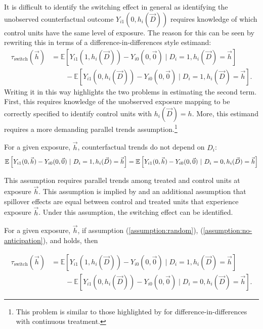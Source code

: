 \documentclass[11pt]{article}
\begin{document}
It is difficult to identify the switching effect in general as identifying the unobserved counterfactual outcome $Y_{i1}(0, h_i(\vec{D}))$ requires knowledge of which control units have the same level of exposure. The reason for this can be seen by rewriting this in terms of a difference-in-differences style estimand:
\begin{align*}
    \tau_{\text{switch}}(\vec{h}) &= \mathbb{E} \left[ Y_{i1}(1, h_i(\vec{D})) - Y_{i0}(0,\vec{0}) \mid D_i = 1, h_i(\vec{D}) = \vec{h} \right] \\ 
    &\quad\quad - \mathbb{E} \left[ Y_{i1}(0, h_i(\vec{D})) - Y_{i0}(0,\vec{0}) \mid D_i = 1, h_i(\vec{D}) = \vec{h} \right].
\end{align*}
Writing it in this way highlights the two problems in estimating the second term. First, this requires knowledge of the unobserved exposure mapping to be correctly specified to identify control units with $h_i(\vec{D}) = h$. More, this estimand requires a more demanding parallel trends assumption.\footnote{This problem is similar to those highlighted by \citet{Callaway_Goodman-Bacon_SantAnna_2021} for difference-in-differences with continuous treatment.}  

\begin{assumption}\label{assumption:parallel-switching}
    For a given exposure, $\vec{h}$, counterfactual trends do not depend on $D_i$:
    \[ 
        \mathbb{E}\left[Y_{i1}(0, \vec{h}) - Y_{i0}(0, \vec{0}) \ \vert \ D_i = 1, h_i(\vec{D}) = \vec{h} \right] = 
        \mathbb{E}\left[Y_{i1}(0, \vec{h}) - Y_{i0}(0, \vec{0}) \ \vert \ D_i = 0, h_i(\vec{D}) = \vec{h} \right]
    \]
\end{assumption}

This assumption requires parallel trends among treated and control units at exposure $\vec{h}$. This assumption is implied by  and an additional assumption that spillover effects are equal between control and treated units that experience exposure $\vec{h}$. Under this assumption, the switching effect can be identified.

\begin{proposition}
    For a given exposure, $\vec{h}$, if assumption (\ref{assumption:random}), (\ref{assumption:no-anticipation}), and  holds, then 

    \begin{align*}
        \tau_{\text{switch}}(\vec{h}) &= \mathbb{E} \left[ Y_{i1}(1, h_i(\vec{D})) - Y_{i0}(0,\vec{0}) \mid D_i = 1, h_i(\vec{D}) = \vec{h} \right] \\ 
        &\quad\quad - \mathbb{E} \left[ Y_{i1}(0, h_i(\vec{D})) - Y_{i0}(0,\vec{0}) \mid D_i = 0, h_i(\vec{D}) = \vec{h} \right].
    \end{align*}
\end{proposition}
\end{document}
